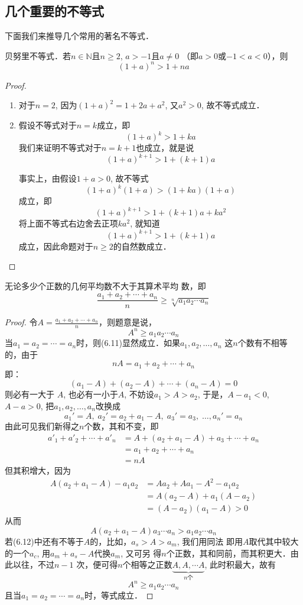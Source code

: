 \subsection{几个重要的不等式}
下面我们来推导几个常用的著名不等式．


\begin{example}
    贝努里不等式．若$n\in\mathbb{N}$且$n\ge 2$, $a>-1$且$a\ne 0$
（即$a>0$或$-1<a<0$），则
\[(1+a)^n>1+na\]
\end{example}


\begin{proof}
\begin{enumerate}
    \item 对于$n=2$, 因为$(1+a)^2=1+2a+a^2$, 又$a^2>0$, 故不等式成立．
\item 假设不等式对于$n=k$成立，即
\[(1+a)^k>1+ka\]
我们来证明不等式对于$n=k+1$也成立，就是说
\[(1+a)^{k+1}>1+(k+1)a\]

事实上，由假设$1+a>0$, 故不等式
\[(1+a)^k(1+a)>(1+ka)(1+a)\]
成立，即
\[(1+a)^{k+1}>1+(k+1)a+ka^2\]
将上面不等式右边舍去正项$ka^2$, 就知道
\[(1+a)^{k+1}>1+(k+1)a\]
成立，因此命题对于$n\ge 2$的自然数成立．
\end{enumerate}
\end{proof}

\begin{example}
    无论多少个正数的几何平均数不大于其算术平均
数，即
\[\frac{a_1+a_2+\cdots+a_n}{n}\ge \sqrt[n]{a_1a_2\cdots a_n}\]
\end{example}

\begin{proof}
令$A=\frac{a_1+a_2+\cdots+a_n}{n}$，则题意是说，
\begin{equation}
    A^n\ge a_1a_2\cdots a_n
\end{equation}
当$a_1=a_2=\cdots= a_n$时，则(6.11)显然成立．如果$a_1,a_2,\ldots,a_n$
这$n$个数有不相等的，由于
    \[nA=a_1+a_2+\cdots+a_n\]
即：
\[(a_1-A)+(a_2-A)+\cdots+(a_n-A)=0\]
则必有一大于
$A$, 也必有一小于$A$, 不妨设$a_1>A>a_2$, 于是，$A-a_1<0$,
$A-a>0$, 把$a_1,a_2,\ldots,a_n$改换成
\begin{equation}
a_1'=A,\; a_2'=a_2+a_1-A,\; a_3'=a_3,\; \ldots, a_n'=a_n
\end{equation}
由此可见我们新得之$n$个数，其和不变，即
\[\begin{split}
    a'_1+a'_2+\cdots +a'_n&=A+(a_2+a_1-A)+a_3+\cdots +a_n\\
&= a_1+a_2+\cdots +a_n\\
&=nA
\end{split}\]
但其积增大，因为
\[\begin{split}
    A(a_2+a_1-A)-a_1a_2&=Aa_2+Aa_1-A^2-a_1a_2\\
&=A(a_2-A)+a_1(A-a_2)\\
&=(A-a_2)(a_1-A)>0
\end{split}\]
从而
\[A(a_2+a_1-A)a_3\cdots a_n>a_1a_2\cdots a_n\]
若(6.12)中还有不等于$A$的，比如，$a_s>A>a_m$, 我们用同法
即用$A$取代其中较大的一个$a_c$, 用$a_m+a_s-A$代换$a_m$, 又可另
得$n$个正数，其和同前，而其积更大．由此以往，不过$n-1$
次，便可得$n$个相等之正数$\underbrace{A,A,\cdots A}_{\text{$n$个}}$, 此时积最大，故有
\[A^n\ge a_1a_2\cdots a_n\]
且当$a_1=a_2=\cdots =a_n$时，等式成立．
\end{proof}

